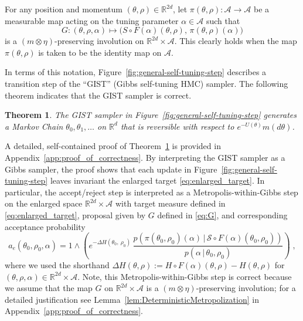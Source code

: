 \documentclass[letterpaper,11pt]{article}
\theoremstyle{plain}%
\newtheorem{theorem}[prototheorem]{Theorem}
\theoremstyle{remark}
\begin{document}
For any position and momentum $(\theta, \rho) \in \mathbb{R}^{2d}$, let $\pi(\theta, \rho) : \mathcal{A} \to \mathcal{A}$ be a measurable map acting on the  tuning parameter $\alpha \in \mathcal{A}$ such that \begin{equation}
 \label{eq:G}
 G: (\theta, \rho, \alpha) \mapsto \Big( S \circ F(\alpha)(\theta, \rho), \, \pi(\theta, \rho)(\alpha) \Big) 
\end{equation} is a $(m \otimes \eta)$-preserving involution on $\mathbb{R}^{2d} \times \mathcal{A}$.   This clearly holds when the map $\pi(\theta, \rho)$ is taken to be the identity map on $\mathcal{A}$.

In terms of this notation, Figure~\ref{fig:general-self-tuning-step} describes a transition step of the ``GIST'' (Gibbs self-tuning HMC) sampler.  The following theorem indicates that the GIST sampler is correct.  
\begin{theorem} \label{thm:correctness}
The GIST sampler in Figure~\ref{fig:general-self-tuning-step} generates a Markov Chain $\theta_0, \theta_1, \dots $ on $\mathbb{R}^d$ that is reversible with respect to $e^{-U( \theta) } m(d \theta)$.
\end{theorem}


A detailed, self-contained proof of Theorem~\ref{thm:correctness} is provided in Appendix~\ref{app:proof_of_correctness}. By interpreting the GIST sampler as a Gibbs sampler, the proof shows that each update in Figure~\ref{fig:general-self-tuning-step} leaves invariant the enlarged target \eqref{eq:enlarged_target}.  In particular, the accept/reject step is interpreted as a Metropolis-within-Gibbs step on the enlarged space $\mathbb{R}^{2d} \times \mathcal{A}$ with target measure defined in \eqref{eq:enlarged_target}, proposal given by $G$ defined in \eqref{eq:G}, and corresponding acceptance probability \begin{equation} \label{eq:acceptanceprobability}
a_e(\theta_0, \rho_0, \alpha) = 1 \wedge \left(  e^{\displaystyle -\Delta H(\theta_0,\ \rho_0)} \, \dfrac{p\left(\pi(\theta_0, \rho_0)(\alpha) \, | \, \mathcal{S} \circ F(\alpha)(\theta_0, \rho_0) \right)}{ p \left(\alpha\, | \, \theta_0, \rho_0 \right)} \right) \;,
\end{equation} 
where we used the shorthand $\Delta H(\theta, \rho) := H \circ F(\alpha)(\theta,\rho) - H(\theta, \rho)$ for $(\theta, \rho, \alpha) \in \mathbb{R}^{2d} \times \mathcal{A}$.
Note, this Metropolis-within-Gibbs step is correct because we assume that the map $G$ on $\mathbb{R}^{2d} \times \mathcal{A}$ is a $(m \otimes \eta)$-preserving involution; for a detailed justification see Lemma~\ref{lem:DeterministicMetropolization} in Appendix~\ref{app:proof_of_correctness}.
\end{document}
